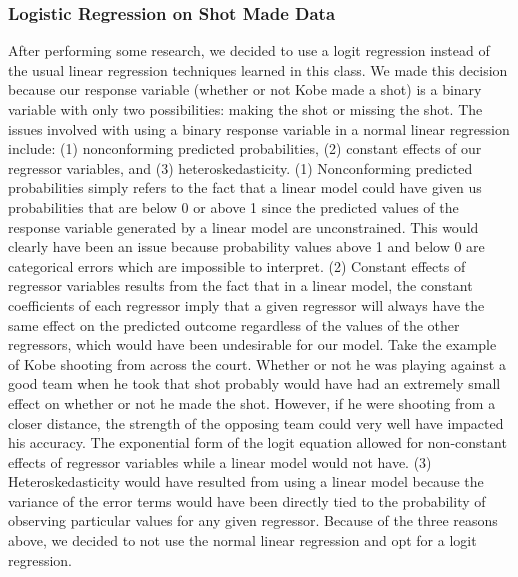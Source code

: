 \documentclass[paper=a4, fontsize=11pt]{scrartcl} %
\numberwithin{equation}{section} %
\numberwithin{figure}{section} %
\numberwithin{table}{section} %
\begin{document}
\subsubsection{Logistic Regression on Shot Made Data}
\hspace*{1cm}After performing some research, we decided to use a logit regression instead of the usual linear regression techniques learned in this class. We made this decision because our response variable (whether or not Kobe made a shot) is a binary variable with only two possibilities: making the shot or missing the shot. The issues involved with using a binary response variable in a normal linear regression include: (1) nonconforming predicted probabilities, (2) constant effects of our regressor variables, and (3) heteroskedasticity. (1) Nonconforming predicted probabilities simply refers to the fact that a linear model could have given us probabilities that are below 0 or above 1 since the predicted values of the response variable generated by a linear model are unconstrained. This would clearly have been an issue because probability values above 1 and below 0 are categorical errors which are impossible to interpret. (2) Constant effects of regressor variables results from the fact that in a linear model, the constant coefficients of each regressor imply that a given regressor will always have the same effect on the predicted outcome regardless of the values of the other regressors, which would have been undesirable for our model. Take the example of Kobe shooting from across the court. Whether or not he was playing against a good team when he took that shot probably would have had an extremely small effect on whether or not he made the shot. However, if he were shooting from a closer distance, the strength of the opposing team could very well have impacted his accuracy. The exponential form of the logit equation allowed for non-constant effects of regressor variables while a linear model would not have. (3) Heteroskedasticity would have resulted from using a linear model because the variance of the error terms would have been directly tied to the probability of observing particular values for any given regressor. Because of the three reasons above, we decided to not use the normal linear regression and opt for a logit regression. 
\end{document}

